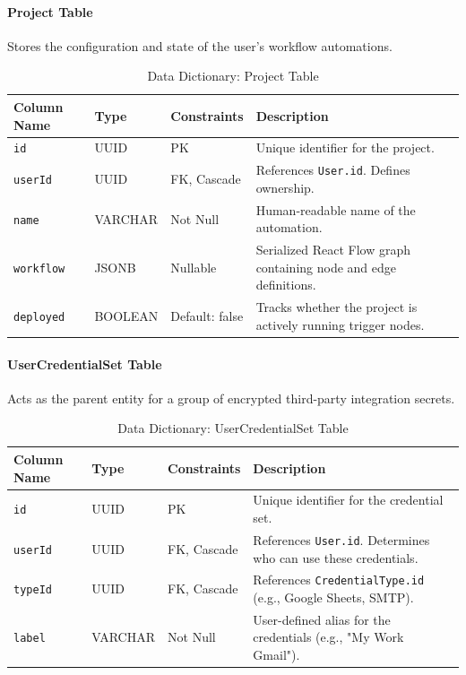 \paragraph{Project Table}
Stores the configuration and state of the user's workflow automations.
\begin{table}[H]
\centering
\renewcommand{\arraystretch}{1.3}
\begin{tabularx}{\textwidth}{|l|l|l|X|}
\hline
\textbf{Column Name} & \textbf{Type} & \textbf{Constraints} & \textbf{Description} \\
\hline
\texttt{id} & UUID & PK & Unique identifier for the project. \\
\hline
\texttt{userId} & UUID & FK, Cascade & References \texttt{User.id}. Defines ownership. \\
\hline
\texttt{name} & VARCHAR & Not Null & Human-readable name of the automation. \\
\hline
\texttt{workflow} & JSONB & Nullable & Serialized React Flow graph containing node and edge definitions. \\
\hline
\texttt{deployed} & BOOLEAN & Default: false & Tracks whether the project is actively running trigger nodes. \\
\hline
\end{tabularx}
\caption{Data Dictionary: Project Table}
\label{tab:dict-project}
\end{table}

\paragraph{UserCredentialSet Table}
Acts as the parent entity for a group of encrypted third-party integration secrets.
\begin{table}[H]
\centering
\renewcommand{\arraystretch}{1.3}
\begin{tabularx}{\textwidth}{|l|l|l|X|}
\hline
\textbf{Column Name} & \textbf{Type} & \textbf{Constraints} & \textbf{Description} \\
\hline
\texttt{id} & UUID & PK & Unique identifier for the credential set. \\
\hline
\texttt{userId} & UUID & FK, Cascade & References \texttt{User.id}. Determines who can use these credentials. \\
\hline
\texttt{typeId} & UUID & FK, Cascade & References \texttt{CredentialType.id} (e.g., Google Sheets, SMTP). \\
\hline
\texttt{label} & VARCHAR & Not Null & User-defined alias for the credentials (e.g., "My Work Gmail"). \\
\hline
\end{tabularx}
\caption{Data Dictionary: UserCredentialSet Table}
\label{tab:dict-credentialset}
\end{table}

